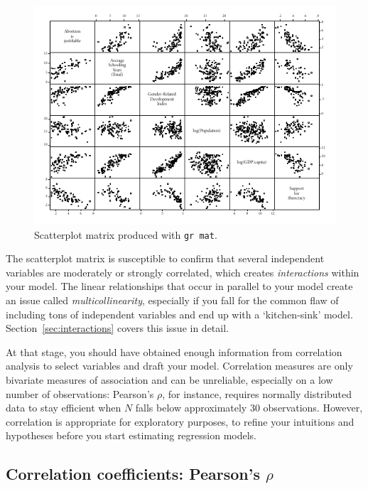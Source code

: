 \begin{figure}[htp]
	\centering
	\includegraphics[width=.9\textwidth]{images/abortion_grmat.pdf}

	\caption[Scatterplot matrix with ]{\label{fig:grmat}
	Scatterplot matrix produced with \texttt{gr mat}. \qog}
\end{figure}%

The scatterplot matrix is susceptible to confirm that several independent variables are moderately or strongly correlated, which creates \emph{interactions} within your model. The linear relationships that occur in parallel to your model create an issue called \emph{multicollinearity}, especially if you fall for the common flaw of including tons of independent variables and end up with a `kitchen-sink' model.\cite{Schrodt:2011a} Section~\ref{sec:interactions} covers this issue in detail.

At that stage, you should have obtained enough information from correlation analysis to select variables and draft your model. Correlation measures are only bivariate measures of association and can be unreliable, especially on a low number of observations: Pearson's $\rho$, for instance, requires normally distributed data to stay efficient when $N$ falls below approximately 30 observations. However, correlation is appropriate for exploratory purposes, to refine your intuitions and hypotheses before you start estimating regression models.

  \subsection{Correlation coefficients: Pearson's $\rho$}

